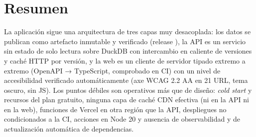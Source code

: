 \section{Resumen}

La aplicación sigue una arquitectura de tres capas muy desacoplada: los datos se publican como artefacto inmutable y verificado (release ), la API es un servicio sin estado de solo lectura sobre DuckDB con intercambio en caliente de versiones y caché HTTP por versión, y la web es un cliente de servidor tipado extremo a extremo (OpenAPI → TypeScript, comprobado en CI) con un nivel de accesibilidad verificado automáticamente (axe WCAG 2.2 AA en 21 URL, tema oscuro, sin JS). Los puntos débiles son operativos más que de diseño: \emph{cold start} y recursos del plan gratuito, ninguna capa de caché CDN efectiva (ni en la API ni en la web), funciones de Vercel en otra región que la API, despliegues no condicionados a la CI, acciones en Node 20 y ausencia de observabilidad y de actualización automática de dependencias.
